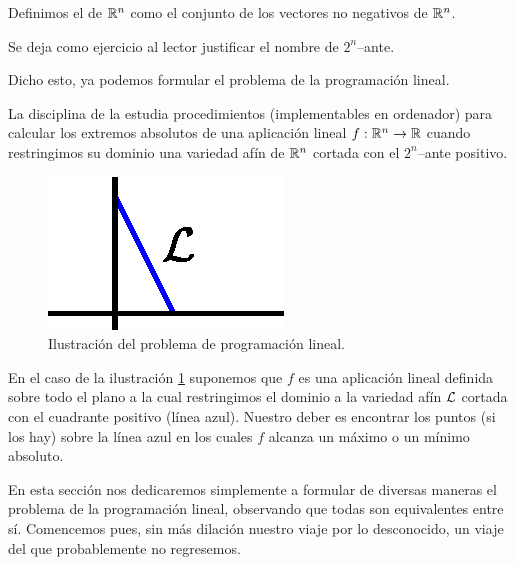 \begin{defi}
	Definimos el  de $\mathbb{R}^n$ como el conjunto de los vectores no negativos de $\mathbb{R}^n$.
	
	Se deja como ejercicio al lector justificar el nombre de $2^n$--ante.
\end{defi}
Dicho esto, ya podemos formular el problema de la programación lineal.
\begin{prob}
	\label{fund_prob_formulacionGeneral}
	La disciplina de la  estudia procedimientos (implementables en ordenador) para calcular los extremos absolutos de una aplicación lineal $f:\mathbb{R}^n\to\mathbb{R}$ cuando restringimos su dominio una variedad afín de $\mathbb{R}^n$ cortada con el $2^n$--ante positivo.
	
	\begin{figure}[h!]
		\centering
		\label{fund_img_problemaGeneral}
		\includegraphics[scale = 0.75]{img/problemaGeneral}
		\caption{Ilustración del problema de programación lineal.}
	\end{figure}
	En el caso de la ilustración \ref{fund_img_problemaGeneral} suponemos que $f$ es una aplicación lineal definida sobre todo el plano a la cual restringimos el dominio a la variedad afín $\mathcal{L}$ cortada con el cuadrante positivo (línea azul). Nuestro deber es encontrar los puntos (si los hay) sobre la línea azul en los cuales $f$ alcanza un máximo o un mínimo absoluto.
\end{prob} 
En esta sección nos dedicaremos simplemente a formular de diversas maneras el problema de la programación lineal, observando que todas son equivalentes entre sí. Comencemos pues, sin más dilación nuestro viaje por lo desconocido, un viaje del que probablemente no regresemos.

